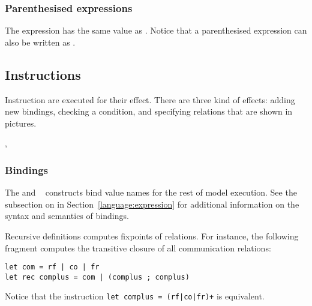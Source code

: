 \subsubsection*{Parenthesised expressions}
The expression 
has the same value as .
Notice that a parenthesised expression
can also be written as  .

\subsection{\label{language:instruction}Instructions}
Instruction are executed for their  effect.
There are three kind of effects: adding new bindings,
checking a condition, and specifying relations that are shown in pictures.
\begin{syntax}
 \is{}   \brepet{}   \erepet{}
\alt {}   \brepet{}   \erepet{}
\alt {}  \boption {} \eoption
\alt {}  \T{(}  \T{)} \T{=} \brepet {} \erepet {}
\alt {}  \T{(}  \T{)}
\alt {}   
\alt {}  \brepet \T{,}  \erepet
\alt {}  \brepet \T{,}  \erepet
\alt {} 
\sep
{} \is {} \orelse {} \orelse {}
\end{syntax}

\subsubsection*{Bindings}
The  and ~ constructs bind value names for the rest
of model execution.
See the subsection on 
in Section~\ref{language:expression}
for additional information on the syntax and semantics of bindings.


Recursive definitions computes fixpoints of relations.
For instance, the following fragment computes the transitive closure of
all communication relations:
\begin{verbatim}
let com = rf | co | fr
let rec complus = com | (complus ; complus)
\end{verbatim}
Notice that the instruction \verb-let complus = (rf|co|fr)+- is equivalent.


